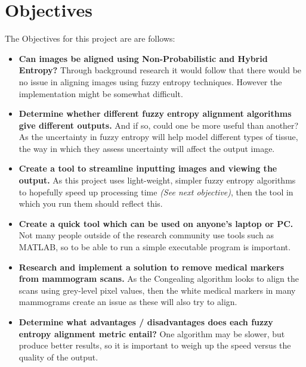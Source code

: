 \section{Objectives}
\label{sec:objectives}

The Objectives for this project are are follows:

\begin{itemize}
  \item \textbf{Can images be aligned using Non-Probabilistic and Hybrid Entropy?} Through background research it would follow that there would be no issue in aligning images using fuzzy entropy techniques. However the implementation might be somewhat difficult.
  \item \textbf{Determine whether different fuzzy entropy alignment algorithms give different outputs.} And if so, could one be more useful than another? As the uncertainty in fuzzy entropy will help model different types of tissue, the way in which they assess uncertainty will affect the output image.
  \item \textbf{Create a tool to streamline inputting images and viewing the output.} As this project uses light-weight, simpler fuzzy entropy algorithms to hopefully speed up processing time \textit{(See next objective)}, then the tool in which you run them should reflect this.
  \item \textbf{Create a quick tool which can be used on anyone's laptop or PC.} Not many people outside of the research community use tools such as MATLAB, so to be able to run a simple executable program is important.
  \item \textbf{Research and implement a solution to remove medical markers from mammogram scans.} As the Congealing algorithm looks to align the scans using grey-level pixel values, then the white medical markers in many mammograms create an issue as these will also try to align.
  \item \textbf{Determine what advantages / disadvantages does each fuzzy entropy alignment metric entail?} One algorithm may be slower, but produce better results, so it is important to weigh up the speed versus the quality of the output.
\end{itemize}
